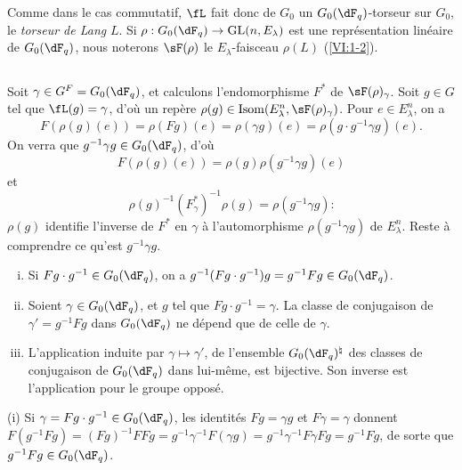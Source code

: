Comme dans le cas commutatif, $\fL$ fait donc de $G_0$ un $G_0(\dF_q)$-torseur 
sur $G_0$, le \emph{torseur de Lang} $L$. Si 
$\rho:G_0(\dF_q) \to \gl(n,E_\lambda)$ est une représentation linéaire de 
$G_0(\dF_q)$, nous noterons $\sF(\rho)$ le $E_\lambda$-faisceau $\rho(L)$ 
(\ref{VI:1-2}). 





\subsection{}\label{VI:1-23}

Soit $\gamma\in G^F=G_0(\dF_q)$, et calculons l'endomorphisme $F^\ast$ de 
$\sF(\rho)_\gamma$. Soit $g\in G$ tel que $\fL(g)=\gamma$, d'où un repère 
$\rho(g)\in \operatorname{Isom}(E_\lambda^n,\sF(\rho)_\gamma)$. Pour 
$e\in E_\lambda^n$, on a 
\[
  F(\rho(g)(e)) = \rho(F g)(e) = \rho(\gamma g)(e) = \rho(g\cdot g^{-1}\gamma g)(e) \text{.}
\]
On verra que $g^{-1} \gamma g\in G_0(\dF_q)$, d'où 
\[
  F(\rho(g)(e)) = \rho(g) \rho(g^{-1}\gamma g)(e)
\]
et 
\begin{equation*}\tag{1.23.1}\label{VI:eq:1-23-1}
  \rho(g)^{-1} (F_\gamma^\ast)^{-1} \rho(g) = \rho(g^{-1} \gamma g) \text{:}
\end{equation*}
$\rho(g)$ identifie l'inverse de $F^\ast$ en $\gamma$ à l'automorphisme 
$\rho(g^{-1} \gamma g)$ de $E_\lambda^n$. Reste à comprendre ce qu'est 
$g^{-1} \gamma g$. 





\begin{lemma_}\label{VI:1-24}
\begin{enumerate}[(i)]
  \item Si $F g\cdot g^{-1} \in G_0(\dF_q)$, on a 
    $g^{-1} (F g\cdot g^{-1}) g = g^{-1} F g\in G_0(\dF_q)$.
  \item Soient $\gamma\in G_0(\dF_q)$, et $g$ tel que 
    $F g\cdot g^{-1} = \gamma$. La classe de conjugaison de $\gamma'=g^{-1} Fg$ 
    dans $G_0(\dF_q)$ ne dépend que de celle de $\gamma$. 
  \item L'application induite par $\gamma\mapsto \gamma'$, de l'ensemble 
    $G_0(\dF_q)^\natural$ des classes de conjugaison de $G_0(\dF_q)$ dans 
    lui-même, est bijective. Son inverse est l'application pour le groupe 
    opposé. 
\end{enumerate}
\end{lemma_}

(i) Si $\gamma= F g\cdot g^{-1}\in G_0(\dF_q)$, les identités $F g=\gamma g$ 
et 
$F\gamma=\gamma$ donnent $F(g^{-1} F g) = (F g)^{-1} F F g = g^{-1} \gamma^{-1} F(\gamma g) = g^{-1} \gamma^{-1} F \gamma F g = g^{-1} F g$, 
de sorte que $g^{-1} F g \in G_0(\dF_q)$. 

